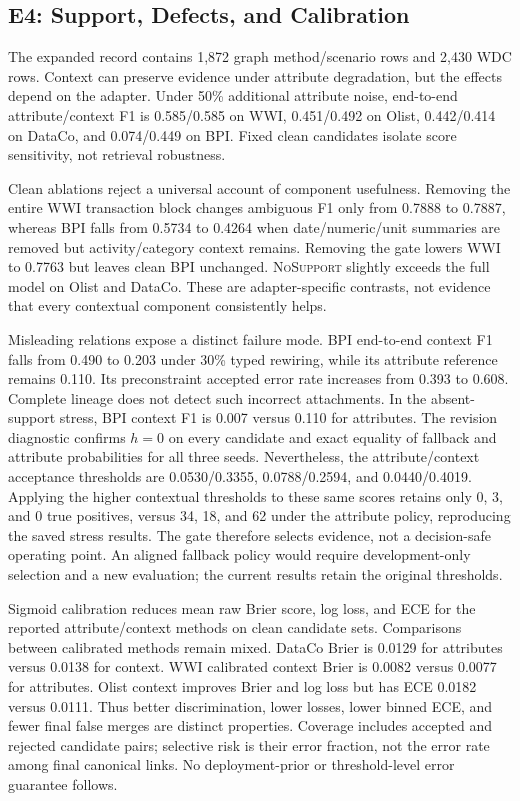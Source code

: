 \documentclass[conference,letterpaper]{IEEEtran}
\newcommand{\method}[1]{\textsc{#1}}
\begin{document}
\subsection{E4: Support, Defects, and Calibration}
The expanded record contains 1,872 graph method/scenario rows and 2,430 WDC rows. Context can preserve evidence under attribute degradation, but the effects depend on the adapter. Under 50\% additional attribute noise, end-to-end attribute/context F1 is 0.585/0.585 on WWI, 0.451/0.492 on Olist, 0.442/0.414 on DataCo, and 0.074/0.449 on BPI. Fixed clean candidates isolate score sensitivity, not retrieval robustness.

Clean ablations reject a universal account of component usefulness. Removing the entire WWI transaction block changes ambiguous F1 only from 0.7888 to 0.7887, whereas BPI falls from 0.5734 to 0.4264 when date/numeric/unit summaries are removed but activity/category context remains. Removing the gate lowers WWI to 0.7763 but leaves clean BPI unchanged. \method{NoSupport} slightly exceeds the full model on Olist and DataCo. These are adapter-specific contrasts, not evidence that every contextual component consistently helps.

Misleading relations expose a distinct failure mode. BPI end-to-end context F1 falls from 0.490 to 0.203 under 30\% typed rewiring, while its attribute reference remains 0.110. Its preconstraint accepted error rate increases from 0.393 to 0.608. Complete lineage does not detect such incorrect attachments. In the absent-support stress, BPI context F1 is 0.007 versus 0.110 for attributes. The revision diagnostic confirms $h=0$ on every candidate and exact equality of fallback and attribute probabilities for all three seeds. Nevertheless, the attribute/context acceptance thresholds are 0.0530/0.3355, 0.0788/0.2594, and 0.0440/0.4019. Applying the higher contextual thresholds to these same scores retains only 0, 3, and 0 true positives, versus 34, 18, and 62 under the attribute policy, reproducing the saved stress results. The gate therefore selects evidence, not a decision-safe operating point. An aligned fallback policy would require development-only selection and a new evaluation; the current results retain the original thresholds.

Sigmoid calibration reduces mean raw Brier score, log loss, and ECE for the reported attribute/context methods on clean candidate sets. Comparisons between calibrated methods remain mixed. DataCo Brier is 0.0129 for attributes versus 0.0138 for context. WWI calibrated context Brier is 0.0082 versus 0.0077 for attributes. Olist context improves Brier and log loss but has ECE 0.0182 versus 0.0111. Thus better discrimination, lower losses, lower binned ECE, and fewer final false merges are distinct properties. Coverage includes accepted and rejected candidate pairs; selective risk is their error fraction, not the error rate among final canonical links. No deployment-prior or threshold-level error guarantee follows.
\end{document}
